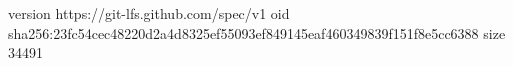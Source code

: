 version https://git-lfs.github.com/spec/v1
oid sha256:23fc54cec48220d2a4d8325ef55093ef849145eaf460349839f151f8e5cc6388
size 34491
